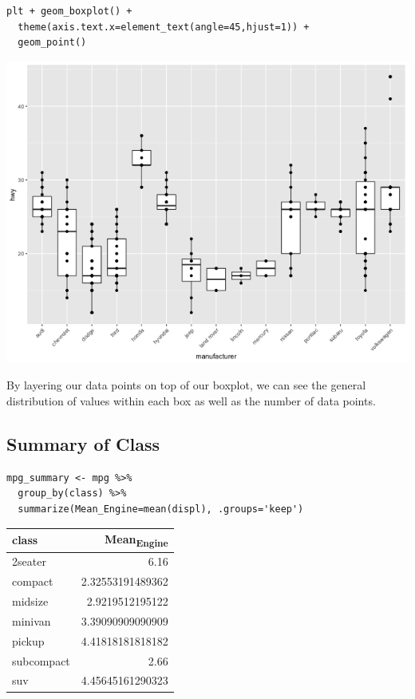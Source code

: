 \documentclass[11pt]{article}
\begin{document}
\begin{org}
\end{org}

\begin{verbatim}
plt + geom_boxplot() +
  theme(axis.text.x=element_text(angle=45,hjust=1)) +
  geom_point()
\end{verbatim}

\begin{org}
\begin{center}
\includegraphics[width=.9\linewidth]{./resources/mpg_layer1.png}
\end{center}
\end{org}

By layering our data points on top of our boxplot, we can see the general distribution of values within each box as well as the number of data points.

\subsection{Summary of Class}
\label{sec:orgf6865e8}

\begin{verbatim}
mpg_summary <- mpg %>%
  group_by(class) %>%
  summarize(Mean_Engine=mean(displ), .groups='keep')
\end{verbatim}

\begin{org}
\begin{center}
\begin{tabular}{lr}
class & Mean\textsubscript{Engine}\\
\hline
2seater & 6.16\\
compact & 2.32553191489362\\
midsize & 2.9219512195122\\
minivan & 3.39090909090909\\
pickup & 4.41818181818182\\
subcompact & 2.66\\
suv & 4.45645161290323\\
\end{tabular}
\end{center}
\end{org}
\end{document}

